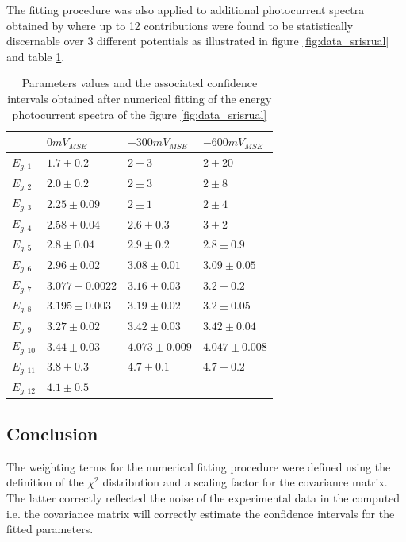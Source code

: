 \documentclass[10pt, 3p, sort&compress]{elsarticle}
\begin{document}
The fitting procedure was also applied to additional photocurrent spectra obtained by \citet{srisrual2013} where up to 12 contributions were found to be statistically discernable over 3 different potentials as illustrated in figure \ref{fig:data_srisrual} and table \ref{table:data_srisrual}.
\begin{table}[h]
\tiny
\begin{tabular}{ p{1cm}|p{2cm}p{2cm} p{2cm}}
\toprule
                & $0 mV_{MSE}$ & $-300 mV_{MSE}$ & $-600 mV_{MSE}$ \\
\midrule
$E_{g,1}$   & $1.7 \pm 0.2$ & $2 \pm 3$ & $2 \pm 20$ \\
$E_{g,2}$   & $2.0 \pm 0.2$ & $2 \pm 3$ & $2 \pm 8$ \\
$E_{g,3}$   & $2.25 \pm 0.09$ & $2 \pm 1$ & $2 \pm 4$ \\
$E_{g,4}$   & $2.58 \pm 0.04$ & $2.6 \pm 0.3$ & $3 \pm 2$ \\
$E_{g,5}$   & $2.8 \pm 0.04$ & $2.9 \pm 0.2$ & $2.8 \pm 0.9$ \\
$E_{g,6}$   & $2.96 \pm 0.02$ & $3.08 \pm 0.01$ & $3.09 \pm 0.05$ \\
$E_{g,7}$   & $3.077 \pm 0.0022$ & $3.16 \pm 0.03$ & $3.2 \pm 0.2$ \\
$E_{g,8}$   & $3.195 \pm 0.003$ & $3.19 \pm 0.02$ & $3.2 \pm 0.05$ \\
$E_{g,9}$   & $3.27 \pm 0.02$ & $3.42 \pm 0.03$ & $3.42 \pm 0.04$ \\
$E_{g,10}$   & $3.44 \pm 0.03$ & $4.073 \pm 0.009$ & $4.047 \pm 0.008$ \\
$E_{g,11}$   & $3.8 \pm 0.3$ & $4.7 \pm 0.1$ & $4.7 \pm 0.2$ \\
$E_{g,12}$   & $4.1 \pm 0.5$ &  &  \\
     
\bottomrule
\end{tabular}
\caption{Parameters values and the associated confidence intervals obtained after numerical fitting of the energy photocurrent spectra of the figure \ref{fig:data_srisrual}}
\label{table:data_srisrual}
\end{table}

\subsection{Conclusion} 

The weighting terms for the numerical fitting procedure were defined using the definition of the $\chi ^2$ distribution and a scaling factor for the covariance matrix.
The latter correctly reflected the noise of the experimental data in the computed i.e. the covariance matrix will correctly estimate the confidence intervals for the fitted parameters. 
\end{document}
